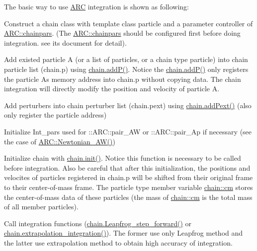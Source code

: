 The basic way to use \hyperlink{namespaceARC}{A\+RC} integration is shown as following\+:
\begin{DoxyEnumerate}
\item Construct a chain class with template class particle and a parameter controller of \hyperlink{classARC_1_1chainpars}{A\+R\+C\+::chainpars}. (The \hyperlink{classARC_1_1chainpars}{A\+R\+C\+::chainpars} should be configured first before doing integration. see its document for detail).
\item Add existed particle \textquotesingle{}A\textquotesingle{} (or a list of particles, or a chain type particle) into chain particle list (chain.\+p) using \hyperlink{classARC_1_1chain_a6af4a9c65329265a45f0210c104fa96a}{chain.\+add\+P()}. Notice the \hyperlink{classARC_1_1chain_a6af4a9c65329265a45f0210c104fa96a}{chain.\+add\+P()} only registers the particle A\textquotesingle{}s memory address into chain.\+p without copying data. The chain integration will directly modify the position and velocity of particle A.
\item Add perturbers into chain perturber list (chain.\+pext) using \hyperlink{classARC_1_1chain_ab6892980b326bd0bbe8a873a71892801}{chain.\+add\+Pext()} (also only register the particle address)
\item Initialize Int\+\_\+pars used for \+::\+A\+R\+C\+::pair\+\_\+\+AW or \+::\+A\+R\+C\+::pair\+\_\+\+Ap if necessary (see the case of \hyperlink{namespaceNTA_a831c3f8f362f34f1f987ee158e38c016}{A\+R\+C\+::\+Newtonian\+\_\+\+A\+W()})
\item Initialize chain with \hyperlink{classARC_1_1chain_a3fe37720ceb48c14905c92d3e25e71a4}{chain.\+init()}. Notice this function is necessary to be called before integration. Also be careful that after this initialization, the positions and velocites of particles registered in chain.\+p will be shifted from their original frame to their center-\/of-\/mass frame. The particle type member variable \hyperlink{classARC_1_1chain_a2eead75bd916fa7ffc05341645527847}{chain\+::cm} stores the center-\/of-\/mass data of these particles (the mass of \hyperlink{classARC_1_1chain_a2eead75bd916fa7ffc05341645527847}{chain\+::cm} is the total mass of all member particles).
\item Call integration functions (\hyperlink{classARC_1_1chain_aff3cd92c840d1bbbc903a8a07eb079d0}{chain.\+Leapfrog\+\_\+step\+\_\+forward()} or \hyperlink{classARC_1_1chain_ae4d0002cceee2397101a43b3755f927e}{chain.\+extrapolation\+\_\+integration()}). The former use only Leapfrog method and the latter use extrapolation method to obtain high accuracy of integration.

\end{DoxyEnumerate}
